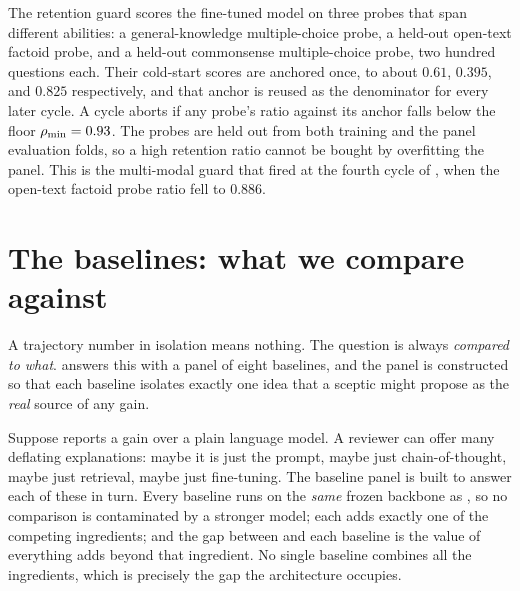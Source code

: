 \begin{precise}
The retention guard scores the fine-tuned model on three probes that span different
abilities: a general-knowledge multiple-choice probe, a held-out open-text factoid
probe, and a held-out commonsense multiple-choice probe, two hundred questions each.
Their cold-start scores are anchored once, to about $0.61$, $0.395$, and $0.825$
respectively, and that anchor is reused as the denominator for every later cycle. A
cycle aborts if any probe's ratio against its anchor falls below the floor
$\rho_{\min} = 0.93$. The probes are held out from both training and the panel
evaluation folds, so a high retention ratio cannot be bought by overfitting the
panel. This is the multi-modal guard that fired at the fourth cycle of
, when the open-text factoid probe ratio fell to $0.886$.
\end{precise}

\section{The baselines: what we compare against}
\label{sec:bench-baselines}

A trajectory number in isolation means nothing. The question is always
\emph{compared to what}. \caem{} answers this with a panel of eight baselines, and
the panel is constructed so that each baseline isolates exactly one idea that a
sceptic might propose as the \emph{real} source of any gain.

\begin{intuition}
Suppose \caem{} reports a gain over a plain language model. A reviewer can offer many
deflating explanations: maybe it is just the prompt, maybe just chain-of-thought,
maybe just retrieval, maybe just fine-tuning. The baseline panel is built to answer
each of these in turn. Every baseline runs on the \emph{same} frozen backbone as
\caem{}, so no comparison is contaminated by a stronger model; each adds exactly one
of the competing ingredients; and the gap between \caem{} and each baseline is the
value of everything \caem{} adds beyond that ingredient. No single baseline combines
all the ingredients, which is precisely the gap the architecture occupies.
\end{intuition}

